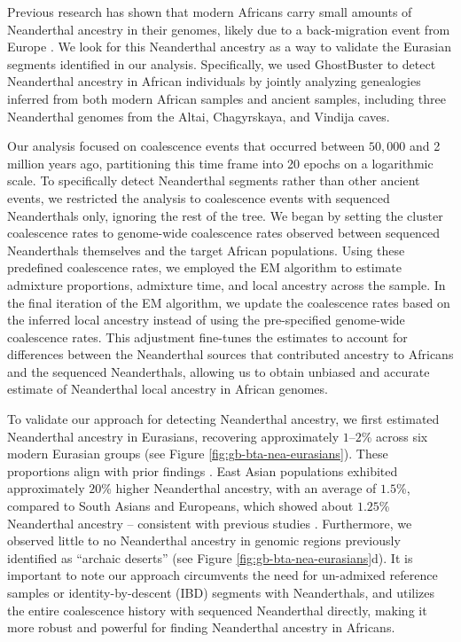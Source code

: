 Previous research has shown that modern Africans carry small amounts of Neanderthal ancestry in their genomes, likely due to a back-migration event from Europe \cite{chen2020identifying, bergstrom2020insights, wang2013apparent, hollfelder2017northeast}. We look for this Neanderthal ancestry as a way to validate the Eurasian segments identified in our analysis. Specifically, we used GhostBuster to detect Neanderthal ancestry in African individuals by jointly analyzing genealogies inferred from both modern African samples and ancient samples, including three Neanderthal genomes from the Altai, Chagyrskaya, and Vindija caves.

Our analysis focused on coalescence events that occurred between $50{,}000$ and 2 million years ago, partitioning this time frame into 20 epochs on a logarithmic scale. To specifically detect Neanderthal segments rather than other ancient events, we restricted the analysis to coalescence events with sequenced Neanderthals only, ignoring the rest of the tree. We began by setting the cluster coalescence rates to genome-wide coalescence rates observed between sequenced Neanderthals themselves and the target African populations. Using these predefined coalescence rates, we employed the EM algorithm to estimate admixture proportions, admixture time, and local ancestry across the sample. In the final iteration of the EM algorithm, we update the coalescence rates based on the inferred local ancestry instead of using the pre-specified genome-wide coalescence rates. This adjustment fine-tunes the estimates to account for differences between the Neanderthal sources that contributed ancestry to Africans and the sequenced Neanderthals, allowing us to obtain unbiased and accurate estimate of Neanderthal local ancestry in African genomes. 

To validate our approach for detecting Neanderthal ancestry, we first estimated Neanderthal ancestry in Eurasians, recovering approximately $1$–$2$\% across six modern Eurasian groups (see Figure \ref{fig:gb-bta-nea-eurasians}). These proportions align with prior findings \cite{prufer2014complete,skov2020nature}. East Asian populations exhibited approximately $20$\% higher Neanderthal ancestry, with an average of $1.5$\%, compared to South Asians and Europeans, which showed about $1.25$\% Neanderthal ancestry -- consistent with previous studies \cite{meyer2012high,iasi2024neandertal}. Furthermore, we observed little to no Neanderthal ancestry in genomic regions previously identified as ``archaic deserts'' \cite{sankararaman2016combined,vernot2016excavating} (see Figure \ref{fig:gb-bta-nea-eurasians}d).  It is important to note our approach circumvents the need for un-admixed reference samples or identity-by-descent (IBD) segments with Neanderthals, and utilizes the entire coalescence history with sequenced Neanderthal directly, making it more robust and powerful for finding Neanderthal ancestry in Africans.  

